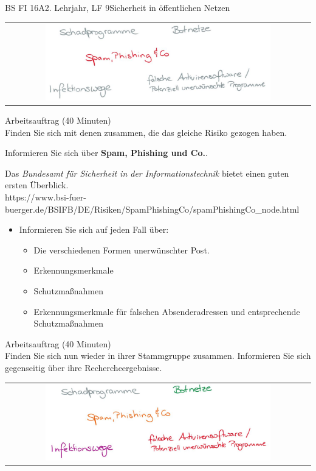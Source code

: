\documentclass[oneside,openany,headings=optiontotoc,11pt,numbers=noenddot]{scrreprt}
\begin{document}
\begin{worksheet}{BS FI 16A}{2. Lehrjahr, LF 9}{Sicherheit in öffentlichen Netzen}
		\newpage
		\setcounter{page}{1}
		\begin{framed}
			\begin{tabular}{lcr}
				& \includegraphics[width=0.8\textwidth]{Bilder/SpamPhishing.jpg} & \\
			\end{tabular}
		\end{framed}
		\color{codegray}Arbeitsauftrag (40 Minuten)\\
		\color{black}
		Finden Sie sich mit denen zusammen, die das gleiche Risiko gezogen haben.
		\par
		\bigskip
		\noindent
		Informieren Sie sich über \textbf{Spam, Phishing und Co.}.
		\par\bigskip\noindent
		Das \textit{Bundesamt für Sicherheit in der Informationstechnik} bietet einen guten ersten Überblick.\\
		\small{\color{codegray}https://www.bsi-fuer-buerger.de/BSIFB/DE/Risiken/SpamPhishingCo/spamPhishingCo\_node.html}
		\normalsize
		\begin{itemize}
			\item[] Informieren Sie sich auf jeden Fall über:
			\begin{itemize}
				\item Die verschiedenen Formen unerwünschter Post.
				\item Erkennungsmerkmale
				\item Schutzmaßnahmen
				\item Erkennungsmerkmale für falschen Absenderadressen und entsprechende Schutzmaßnahmen
			\end{itemize}
		\end{itemize}
		\par
		\bigskip
		\noindent
		
		\color{codegray}Arbeitsauftrag (40 Minuten)\\
		\color{black}
		Finden Sie sich nun wieder in ihrer Stammgruppe zusammen. Informieren Sie sich gegenseitig über ihre Rechercheergebnisse.

		\newpage
		\setcounter{page}{1}
		\noindent
		\begin{framed}
			\begin{tabular}{lcr}
				& \includegraphics[width=0.8\textwidth]{Bilder/Gefahren.jpg} &
			\end{tabular}
		\end{framed}
		

\end{worksheet}
\end{document}
